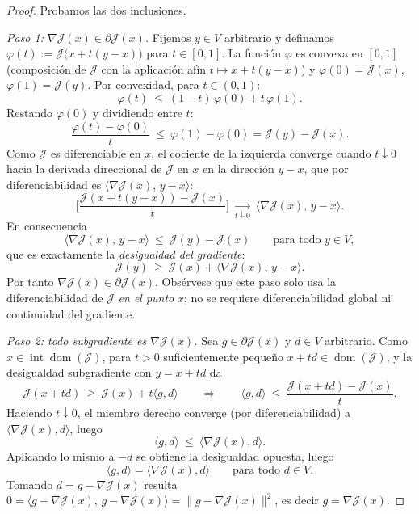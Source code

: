 \documentclass[12pt]{book}
\theoremstyle{definition}
\theoremstyle{plain}
\theoremstyle{remark}
\begin{document}
\begin{proof}
Probamos las dos inclusiones.

\emph{Paso 1: $\nabla\mathcal{J}(x)\in\partial\mathcal{J}(x)$.}
Fijemos $y\in V$ arbitrario y definamos
$\varphi(t):=\mathcal{J}\bigl(x+t(y-x)\bigr)$ para $t\in[0,1]$. La
funci\'on $\varphi$ es convexa en $[0,1]$ (composici\'on de
$\mathcal{J}$ con la aplicaci\'on af\'in $t\mapsto x+t(y-x)$) y
$\varphi(0)=\mathcal{J}(x)$, $\varphi(1)=\mathcal{J}(y)$. Por
convexidad, para $t\in(0,1)$:
\[
\varphi(t)\ \le\ (1-t)\,\varphi(0)+t\,\varphi(1).
\]
Restando $\varphi(0)$ y dividiendo entre $t$:
\[
\frac{\varphi(t)-\varphi(0)}{t}\ \le\ \varphi(1)-\varphi(0)
=\mathcal{J}(y)-\mathcal{J}(x).
\]
Como $\mathcal{J}$ es diferenciable en $x$, el cociente de la izquierda
converge cuando $t\downarrow0$ hacia la derivada direccional de
$\mathcal{J}$ en $x$ en la direcci\'on $y-x$, que por diferenciabilidad
es $\langle\nabla\mathcal{J}(x),\,y-x\rangle$:
\[
\biggl[\frac{\mathcal{J}(x+t(y-x))-\mathcal{J}(x)}{t}\biggr]
\ \xrightarrow[t\downarrow0]{}\ 
\langle\nabla\mathcal{J}(x),\,y-x\rangle .
\]
En consecuencia
\[
\langle\nabla\mathcal{J}(x),\,y-x\rangle
\ \le\ \mathcal{J}(y)-\mathcal{J}(x)
\qquad\text{para todo } y\in V,
\]
que es exactamente la \emph{desigualdad del gradiente}:
\[
\mathcal{J}(y)\ \ge\
\mathcal{J}(x)+\langle\nabla\mathcal{J}(x),\,y-x\rangle .
\]
Por tanto $\nabla\mathcal{J}(x)\in\partial\mathcal{J}(x)$.
Obs\'ervese que este paso solo usa la diferenciabilidad de
$\mathcal{J}$ \emph{en el punto} $x$; no se requiere diferenciabilidad
global ni continuidad del gradiente.

\emph{Paso 2: todo subgradiente es $\nabla\mathcal{J}(x)$.}
Sea $g\in\partial\mathcal{J}(x)$ y $d\in V$ arbitrario. Como
$x\in\operatorname{int}\operatorname{dom}(\mathcal{J})$, para $t>0$
suficientemente peque\~no
$x+td\in\operatorname{dom}(\mathcal{J})$, y la desigualdad subgradiente
con $y=x+td$ da
\[
\mathcal{J}(x+td)\ \ge\
\mathcal{J}(x)+t\langle g,d\rangle
\qquad\Longrightarrow\qquad
\langle g,d\rangle\ \le\
\frac{\mathcal{J}(x+td)-\mathcal{J}(x)}{t}.
\]
Haciendo $t\downarrow0$, el miembro derecho converge (por
diferenciabilidad) a $\langle\nabla\mathcal{J}(x),d\rangle$, luego
\[
\langle g,d\rangle\ \le\
\langle\nabla\mathcal{J}(x),d\rangle .
\]
Aplicando lo mismo a $-d$ se obtiene la desigualdad opuesta, luego
\[
\langle g,d\rangle=\langle\nabla\mathcal{J}(x),d\rangle
\qquad\text{para todo } d\in V.
\]
Tomando $d=g-\nabla\mathcal{J}(x)$ resulta
$0=\langle g-\nabla\mathcal{J}(x),\,g-\nabla\mathcal{J}(x)\rangle
=\|g-\nabla\mathcal{J}(x)\|^{2}$, es decir
$g=\nabla\mathcal{J}(x)$.
\end{proof}
\end{document}

